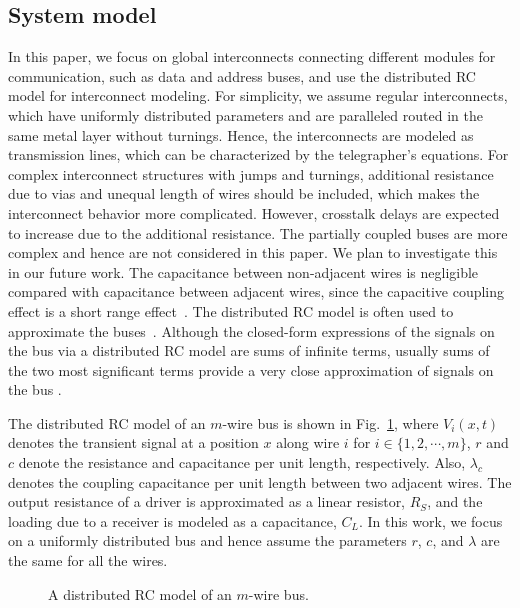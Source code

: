 \documentclass[10pt,journal]{IEEEtran}
\begin{document}
\subsection{System model}

In this paper, we focus on global interconnects connecting different modules for communication, such as data and address buses, and use the distributed RC model for interconnect modeling. For simplicity, we assume regular interconnects, which have uniformly distributed parameters and are paralleled routed in the same metal layer without turnings. Hence, the interconnects are modeled as transmission lines, which can be characterized by the telegrapher's equations.
For complex interconnect structures with jumps and turnings, additional resistance due to vias and unequal length of wires should be included, which makes the interconnect behavior more complicated. However, crosstalk delays are expected to increase due to the additional resistance.
The partially coupled buses are more complex and hence are not considered in this paper. We plan to investigate this in our future work.
The capacitance between non-adjacent wires is negligible compared with capacitance between adjacent wires, since the capacitive coupling effect is a short range effect~\cite{SC_TVLSI02}.
The distributed RC model is often used to approximate the buses~\cite{Rab96}. Although the closed-form expressions of the signals on the bus via a distributed RC model are sums of infinite terms, usually sums of the two most significant terms provide a very close approximation of signals on the bus \cite{Sak93}.


The distributed RC model of an $m$-wire bus is shown in Fig.~\ref{fig:3bus}, where $V_i(x,t)$ denotes the transient signal at a position $x$ along wire $i$ for $i \in \{1,2,\cdots,m\}$, $r$ and $c$ denote the resistance and capacitance per unit length, respectively. Also, $\lambda_c$ denotes the coupling capacitance per unit length between two adjacent wires. The output resistance of a driver is approximated as a linear resistor, $R_S$, and the loading due to a receiver is modeled as a capacitance, $C_L$. In this work, we focus on a uniformly distributed bus and hence assume the parameters $r$, $c$, and $\lambda$ are the same for all the wires.

\begin{figure}[!tb]
\begin{minipage}[b]{1.0\linewidth}
  \centering
 \centerline{}
\end{minipage}
\caption{A distributed RC model of an $m$-wire bus.}
\label{fig:3bus}
\end{figure}
\end{document}
